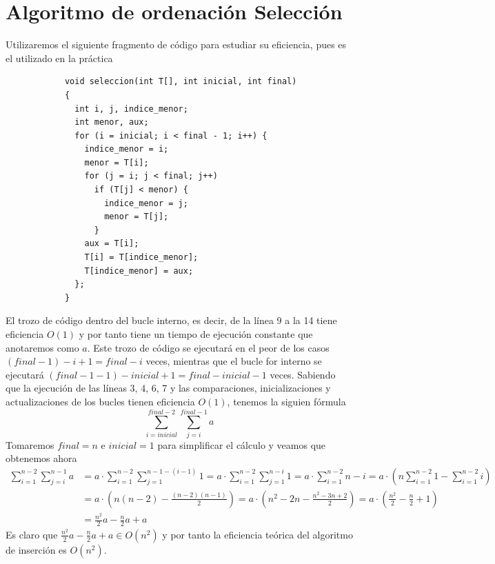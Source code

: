 \documentclass[11pt,openany]{book}
\begin{document}
\section*{Algoritmo de ordenación Selección}
Utilizaremos el siguiente fragmento de código para estudiar su eficiencia, pues es el utilizado en la práctica
\begin{lstlisting}
            void seleccion(int T[], int inicial, int final)
            {
              int i, j, indice_menor;
              int menor, aux;
              for (i = inicial; i < final - 1; i++) {
                indice_menor = i;
                menor = T[i];
                for (j = i; j < final; j++)
                  if (T[j] < menor) {
                    indice_menor = j;
                    menor = T[j];
                  }
                aux = T[i];
                T[i] = T[indice_menor];
                T[indice_menor] = aux;
              };
            }
        \end{lstlisting}
El trozo de código dentro del bucle interno, es decir, de la línea 9 a la 14 tiene eficiencia $O(1)$ y por tanto
tiene un tiempo de ejecución constante que anotaremos como $a$. Este trozo de código se ejecutará en el peor de los casos
$(final-1)-i+1=final-i$ veces, mientras que el bucle for interno se ejecutará $(final-1-1)-inicial+1=final -inicial-1$ veces.
Sabiendo que la ejecución de las líneas 3, 4, 6, 7 y las comparaciones, inicializaciones y actualizaciones de los
bucles tienen eficiencia $O(1)$, tenemos la siguien fórmula
\begin{equation*}
    \sum_{i=inicial}^{final-2} \sum_{j=i}^{final-1}a
\end{equation*}
Tomaremos $final =  n$ e $inicial = 1$ para simplificar el cálculo y veamos que obtenemos ahora
\begin{equation*}\begin{split}
        \sum_{i=1}^{n-2} \sum_{j=i}^{n-1}a&= a \cdot \sum_{i=1}^{n-2} \sum_{j=1}^{n-1-(i-1)}1
        = a \cdot \sum_{i=1}^{n-2} \sum_{j=1}^{n-i}1=a \cdot \sum_{i=1}^{n-2} n-i= a \cdot (n\sum_{i=1}^{n-2}1 - \sum_{i=1}^{n-2}i) \\
        & = a \cdot\left(n(n-2)-\frac{(n-2)(n-1)}{2}\right)= a \cdot \left(n^2-2n-\frac{n^2-3n+2}{2}\right)= a \cdot \left(\frac{n^2}{2}-\frac{n}{2}+1\right) \\
        & = \frac{n^2}{2}a-\frac{n}{2}a+a
    \end{split}\end{equation*}
Es claro que $\frac{n^2}{2}a-\frac{n}{2}a+a \in O(n^2)$ y por tanto la eficiencia teórica del algoritmo de inserción es $O(n^2)$.
\end{document}
